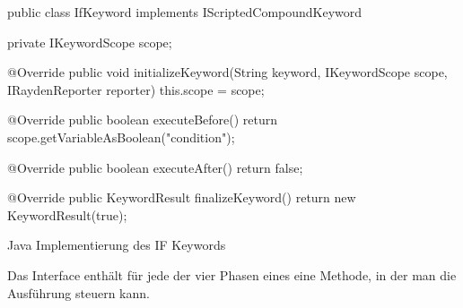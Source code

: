 \begin{program}
\begin{JavaCode}
public class IfKeyword implements IScriptedCompoundKeyword {

  private IKeywordScope scope;

  @Override
  public void initializeKeyword(String keyword, IKeywordScope scope, IRaydenReporter reporter) {
    this.scope = scope;
  }

  @Override
  public boolean executeBefore() {
    return scope.getVariableAsBoolean("condition");
  }

  @Override
  public boolean executeAfter() {
    return false;
  }
  
  @Override
  public KeywordResult finalizeKeyword() {
    return new KeywordResult(true);
  }
}
\end{JavaCode}
\caption{Java Implementierung des IF Keywords}
\label{prog:ifKeywordImpl}
\end{program}

\SuperPar
Das Interface enthält für jede der vier Phasen eines  eine Methode, in der man die Ausführung steuern kann. \\

